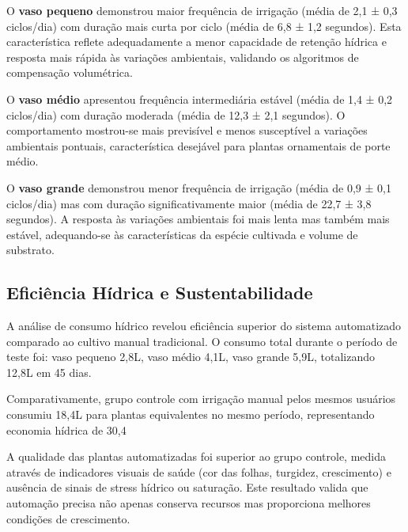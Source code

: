 O \textbf{vaso pequeno} demonstrou maior frequência de irrigação (média de 2,1 ± 0,3 ciclos/dia) com duração mais curta por ciclo (média de 6,8 ± 1,2 segundos). Esta característica reflete adequadamente a menor capacidade de retenção hídrica e resposta mais rápida às variações ambientais, validando os algoritmos de compensação volumétrica.

O \textbf{vaso médio} apresentou frequência intermediária estável (média de 1,4 ± 0,2 ciclos/dia) com duração moderada (média de 12,3 ± 2,1 segundos). O comportamento mostrou-se mais previsível e menos susceptível a variações ambientais pontuais, característica desejável para plantas ornamentais de porte médio.

O \textbf{vaso grande} demonstrou menor frequência de irrigação (média de 0,9 ± 0,1 ciclos/dia) mas com duração significativamente maior (média de 22,7 ± 3,8 segundos). A resposta às variações ambientais foi mais lenta mas também mais estável, adequando-se às características da espécie cultivada e volume de substrato.


\subsection{Eficiência Hídrica e Sustentabilidade}

A análise de consumo hídrico revelou eficiência superior do sistema automatizado comparado ao cultivo manual tradicional. O consumo total durante o período de teste foi: vaso pequeno 2,8L, vaso médio 4,1L, vaso grande 5,9L, totalizando 12,8L em 45 dias.

Comparativamente, grupo controle com irrigação manual pelos mesmos usuários consumiu 18,4L para plantas equivalentes no mesmo período, representando economia hídrica de 30,4%

A qualidade das plantas automatizadas foi superior ao grupo controle, medida através de indicadores visuais de saúde (cor das folhas, turgidez, crescimento) e ausência de sinais de stress hídrico ou saturação. Este resultado valida que automação precisa não apenas conserva recursos mas proporciona melhores condições de crescimento.

